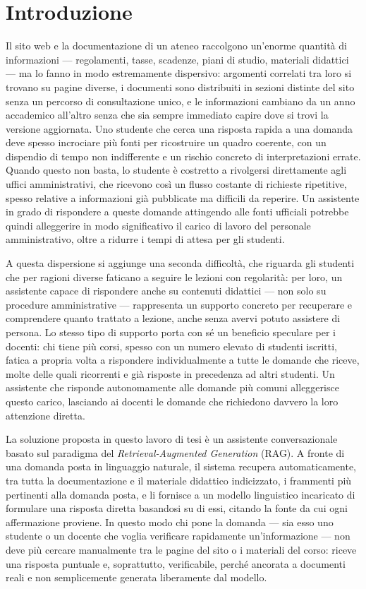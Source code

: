 \chapter{Introduzione}

Il sito web e la documentazione di un ateneo raccolgono un’enorme quantità di informazioni — regolamenti, tasse, scadenze, piani di studio, materiali didattici — ma lo fanno in modo estremamente dispersivo: argomenti correlati tra loro si trovano su pagine diverse, i documenti sono distribuiti in sezioni distinte del sito senza un percorso di consultazione unico, e le informazioni cambiano da un anno accademico all’altro senza che sia sempre immediato capire dove si trovi la versione aggiornata. Uno studente che cerca una risposta rapida a una domanda deve spesso incrociare più fonti per ricostruire un quadro coerente, con un dispendio di tempo non indifferente e un rischio concreto di interpretazioni errate. Quando questo non basta, lo studente è costretto a rivolgersi direttamente agli uffici amministrativi, che ricevono così un flusso costante di richieste ripetitive, spesso relative a informazioni già pubblicate ma difficili da reperire. Un assistente in grado di rispondere a queste domande attingendo alle fonti ufficiali potrebbe quindi alleggerire in modo significativo il carico di lavoro del personale amministrativo, oltre a ridurre i tempi di attesa per gli studenti.

A questa dispersione si aggiunge una seconda difficoltà, che riguarda gli studenti che per ragioni diverse faticano a
seguire le lezioni con regolarità: per loro, un assistente capace di rispondere anche su contenuti didattici --- non
solo su procedure amministrative --- rappresenta un supporto concreto per recuperare e comprendere quanto trattato a
lezione, anche senza avervi potuto assistere di persona. Lo stesso tipo di supporto porta con sé un beneficio
speculare per i docenti: chi tiene più corsi, spesso con un numero elevato di studenti iscritti, fatica a propria
volta a rispondere individualmente a tutte le domande che riceve, molte delle quali ricorrenti e già risposte in
precedenza ad altri studenti. Un assistente che risponde autonomamente alle domande più comuni alleggerisce questo
carico, lasciando ai docenti le domande che richiedono davvero la loro attenzione diretta.

La soluzione proposta in questo lavoro di tesi è un assistente conversazionale basato sul paradigma del
\emph{Retrieval-Augmented Generation} (RAG). A fronte di una domanda posta in linguaggio naturale, il sistema
recupera automaticamente, tra tutta la documentazione e il materiale didattico indicizzato, i frammenti più
pertinenti alla domanda posta, e li fornisce a un modello linguistico incaricato di formulare una risposta diretta
basandosi su di essi, citando la fonte da cui ogni affermazione proviene. In questo modo chi pone la domanda --- sia
esso uno studente o un docente che voglia verificare rapidamente un'informazione --- non deve più cercare manualmente
tra le pagine del sito o i materiali del corso: riceve una risposta puntuale e, soprattutto, verificabile, perché
ancorata a documenti reali e non semplicemente generata liberamente dal modello.

